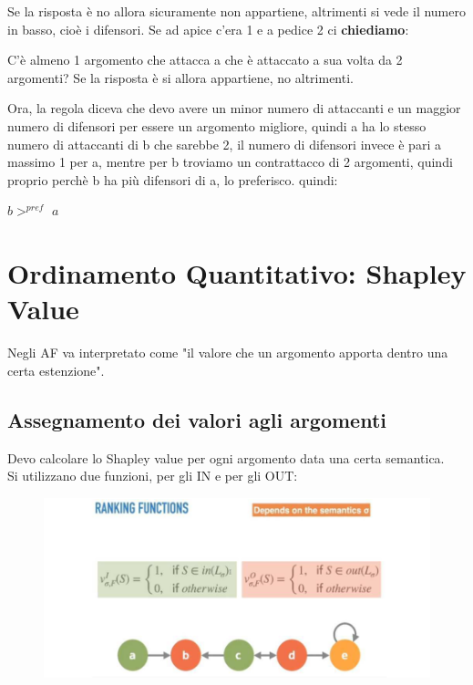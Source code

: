 \noindent Se la risposta è no allora sicuramente non appartiene, altrimenti si vede il numero in basso, cioè i difensori. 
\vspace{0.3cm}
\noindent Se ad apice c’era 1 e a pedice 2 ci \textbf{chiediamo}:

\vspace{0.3cm}

\noindent C’è almeno 1 argomento che attacca a che è attaccato a sua volta da 2 argomenti? Se la risposta è si allora appartiene, no altrimenti.

\vspace{0.3cm}

\noindent Ora, la regola diceva che devo avere un minor numero di attaccanti e un maggior numero di difensori per essere un argomento migliore, quindi a ha lo stesso numero di attaccanti di b che sarebbe 2, il numero di difensori invece è pari a massimo 1 per a, mentre per b troviamo un contrattacco di 2
argomenti, quindi proprio perchè b ha più difensori di a, lo preferisco. quindi:
\begin{center}
    $b >^{pref}$ $a$
\end{center}
\section{Ordinamento Quantitativo: Shapley Value}
Negli AF va interpretato come "il valore che un argomento apporta dentro una certa estenzione".
\subsection{Assegnamento dei valori agli argomenti}
Devo calcolare lo Shapley value per ogni argomento data una certa semantica.
\\
Si utilizzano due funzioni, per gli IN e per gli OUT:
\begin{figure}[htp]
	\centering
    \includegraphics[width=13cm, keepaspectratio]{img/Cap8/ordinamento-quantitativo.png}
\end{figure}

